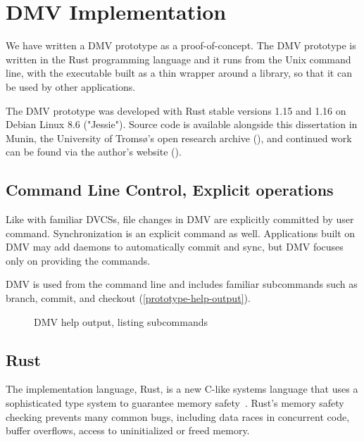 \chapter{DMV Implementation}

We have written a \gls{DMV} prototype as a proof-of-concept. The \gls{DMV}
prototype is written in the Rust programming language and it runs from the Unix
command line, with the executable built as a thin wrapper around a library, so
that it can be used by other applications.

The \gls{DMV} prototype was developed with Rust stable versions 1.15 and 1.16 on
Debian Linux 8.6 ("Jessie"). Source code is available alongside this
dissertation in Munin, the University of Tromsø's open research archive
(\muninurl), and continued work can be found via the author's website (\dmvurl).

%


\section{Command Line Control, Explicit operations}

Like with familiar \glspl{DVCS}, file changes in \gls{DMV} are explicitly
committed by user command. Synchronization is an explicit command as well.
Applications built on \gls{DMV} may add daemons to automatically \gls{commit}
and sync, but \gls{DMV} focuses only on providing the commands.

\gls{DMV} is used from the command line and includes familiar subcommands such
as branch, \gls{commit}, and checkout
(\autoref{prototype-help-output}).

\begin{figure}[]
    \caption{DMV help output, listing subcommands}
    \label{prototype-help-output}


\end{figure}

%


\section{Rust}

The implementation language, Rust, is a new C-like systems language that uses a
sophisticated type system to guarantee memory safety~\cite{rust_acm_sigada}.
Rust's memory safety checking prevents many common bugs, including data races in
concurrent code, buffer overflows, access to uninitialized or freed memory.

